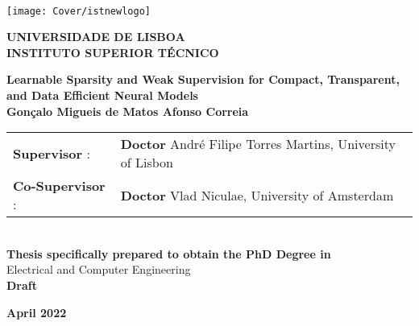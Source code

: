 \setcounter{page}{1} 


\thispagestyle{empty}
\begin{flushleft} ~\\ \vspace{-12mm} \hspace{-12mm}  \texttt{[image: Cover/istnewlogo]}

    \centering
    \Large \textbf{UNIVERSIDADE DE LISBOA \\ INSTITUTO SUPERIOR TÉCNICO}
    \vspace{30mm}

    \vspace{5mm}

    \centering
    \Large \textbf{Learnable Sparsity and Weak Supervision for Compact, Transparent, and Data Efficient Neural Models}
    \\ \vspace{25mm}  %
    \large \textbf{Gonçalo Migueis de Matos Afonso Correia} \\
    \vspace{4cm}

    \begin{minipage}{\textwidth}
        \begin{tabularx}{\textwidth}{ l @{ } l }
            \textbf{Supervisor} :    & \textbf{Doctor} André Filipe Torres Martins, University of Lisbon \\
            \textbf{Co-Supervisor} : & \textbf{Doctor} Vlad Niculae, University of Amsterdam             \\
        \end{tabularx}

    \end{minipage}
    \\ \vspace{20mm}
    \centering
    \large \textbf{Thesis specifically prepared to obtain the PhD Degree in}\\
    \large Electrical and Computer Engineering\\
    \vspace{18mm}
    \Large \textbf{Draft}

    \vspace{15mm}

    \large \textbf{April 2022} \\
    \let\thepage\relax
\end{flushleft}
\pagebreak